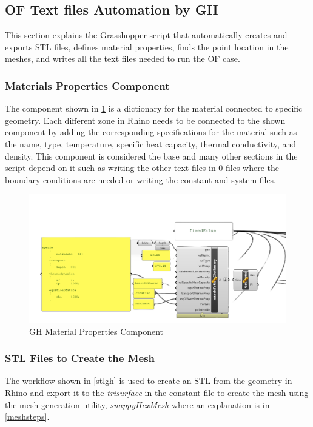 \subsection{OF Text files Automation by GH}   
This section explains the Grasshopper script that automatically creates and exports STL files, defines material properties, finds the point location in the meshes, and writes all the text files needed to run the OF case.

\subsubsection{Materials Properties Component}
The component shown in \ref{matgh} is a dictionary for the material connected to specific geometry. Each different zone in Rhino needs to be connected to the shown component by adding the corresponding specifications for the material such as the name, type, temperature, specific heat capacity, thermal conductivity, and density. This component is considered the base and many other sections in the script depend on it such as writing the other text files in 0 files where the boundary conditions are needed or writing the constant and system files. 


\begin{figure}[tbh]
\centering
\includegraphics[width=0.77\columnwidth]{Figures/materialgh.png}
\hspace{0.7cm}
\caption{GH Material Properties Component}
\label{matgh}
\end{figure}



\subsubsection{STL Files to Create the Mesh}
The workflow shown in \ref{stlgh} is used to create an STL from the geometry in Rhino and export it to the \textit{trisurface} in the constant file to create the mesh using the mesh generation utility, \textit{snappyHexMesh} where an explanation is in \ref{meshsteps}.


